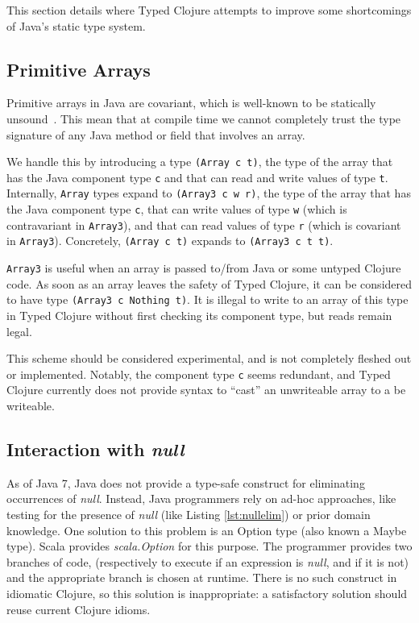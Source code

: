 This section details where Typed Clojure attempts to improve some shortcomings of Java's static type system.

\subsection{Primitive Arrays}
\label{designarrays}

Primitive arrays in Java are covariant, which is well-known to be statically unsound~\cite{OW97,BK99}.
This mean that at compile time we cannot completely trust the type signature of any Java method or field that involves 
an array.

We handle this by introducing a type \lstinline|(Array c t)|, 
the type of the array that has the Java component type \lstinline|c| 
and that can read and write values of type \lstinline|t|.
Internally, \lstinline|Array| types expand to \lstinline|(Array3 c w r)|,
the type of the array that has the Java component type \lstinline|c|,
that can write values of type \lstinline|w| (which is contravariant in \lstinline|Array3|), 
and that can read values of type \lstinline|r| (which is covariant in \lstinline|Array3|).
Concretely, \lstinline|(Array c t)| expands to \lstinline|(Array3 c t t)|.

\lstinline|Array3| is useful when an array is passed to/from Java or some untyped Clojure code.
As soon as an array leaves the safety of Typed Clojure, it can be considered to have type
\lstinline|(Array3 c Nothing t)|. It is illegal to write to an array of this type in Typed Clojure
without first checking its component type, but reads remain legal.

This scheme should be considered experimental, and is not completely fleshed out or implemented.
Notably, the component type \lstinline|c| seems redundant, and Typed Clojure currently
does not provide syntax to ``cast'' an unwriteable array to a be writeable.

\subsection{Interaction with \emph{null}}
\label{sec:interactionnull}

As of Java 7, Java does not provide a type-safe construct for eliminating
occurrences of \emph{null}. Instead, Java programmers rely on ad-hoc approaches,
like testing for the presence of \emph{null} (like Listing \ref{lst:nullelim}) or prior domain knowledge.
One solution to this problem is an Option type (also known a Maybe type).
Scala provides \emph{scala.Option} for this purpose. The programmer provides two branches of code,
(respectively to execute if an expression is \emph{null}, and if it is not)
and the appropriate branch is chosen at runtime.
There is no such construct in idiomatic Clojure, so this solution is inappropriate:
a satisfactory solution should reuse current Clojure idioms.


